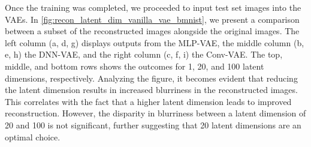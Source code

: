 Once the training was completed, we proceeded to input test set images into the VAEs. In \autoref{fig:recon_latent_dim_vanilla_vae_bmnist}, we present a comparison between a subset of the reconstructed images alongside the original images. The left column (a, d, g) displays outputs from the MLP-VAE, the middle column (b, e, h) the DNN-VAE, and the right column (c, f, i) the Conv-VAE. The top, middle, and bottom rows shows the outcomes for 1, 20, and 100 latent dimensions, respectively. Analyzing the figure, it becomes evident that reducing the latent dimension results in increased blurriness in the reconstructed images. This correlates with the fact that a higher latent dimension leads to improved reconstruction. However, the disparity in blurriness between a latent dimension of 20 and 100 is not significant, further suggesting that 20 latent dimensions are an optimal choice.

